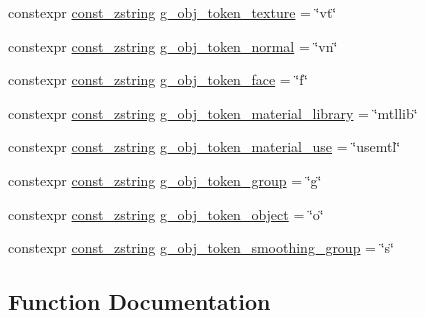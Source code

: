 \begin{DoxyCompactItemize}
\item 
constexpr \hyperlink{namespacemage_abfd9206dc607ceb5d13ec68bf075a5c0}{const\+\_\+zstring} \hyperlink{namespacemage_1_1rendering_1_1loader_a2f28917cef298bc975a0a9b5ceecfb34}{g\+\_\+obj\+\_\+token\+\_\+texture} = \char`\"{}vt\char`\"{}
\item 
constexpr \hyperlink{namespacemage_abfd9206dc607ceb5d13ec68bf075a5c0}{const\+\_\+zstring} \hyperlink{namespacemage_1_1rendering_1_1loader_a1ccd473a1d57fa2581197b20131a7e98}{g\+\_\+obj\+\_\+token\+\_\+normal} = \char`\"{}vn\char`\"{}
\item 
constexpr \hyperlink{namespacemage_abfd9206dc607ceb5d13ec68bf075a5c0}{const\+\_\+zstring} \hyperlink{namespacemage_1_1rendering_1_1loader_ac729da300a11d2af468702b4fd8c17a0}{g\+\_\+obj\+\_\+token\+\_\+face} = \char`\"{}f\char`\"{}
\item 
constexpr \hyperlink{namespacemage_abfd9206dc607ceb5d13ec68bf075a5c0}{const\+\_\+zstring} \hyperlink{namespacemage_1_1rendering_1_1loader_adeb966ab9cb13f0665a23d31d34fc85b}{g\+\_\+obj\+\_\+token\+\_\+material\+\_\+library} = \char`\"{}mtllib\char`\"{}
\item 
constexpr \hyperlink{namespacemage_abfd9206dc607ceb5d13ec68bf075a5c0}{const\+\_\+zstring} \hyperlink{namespacemage_1_1rendering_1_1loader_aca66c986fe0debd4ea787ff4464fbb72}{g\+\_\+obj\+\_\+token\+\_\+material\+\_\+use} = \char`\"{}usemtl\char`\"{}
\item 
constexpr \hyperlink{namespacemage_abfd9206dc607ceb5d13ec68bf075a5c0}{const\+\_\+zstring} \hyperlink{namespacemage_1_1rendering_1_1loader_a71c11c96ce588a1bc2dda43c4b0711c1}{g\+\_\+obj\+\_\+token\+\_\+group} = \char`\"{}g\char`\"{}
\item 
constexpr \hyperlink{namespacemage_abfd9206dc607ceb5d13ec68bf075a5c0}{const\+\_\+zstring} \hyperlink{namespacemage_1_1rendering_1_1loader_a8127f2d8ffe798289f55d789c317ef19}{g\+\_\+obj\+\_\+token\+\_\+object} = \char`\"{}o\char`\"{}
\item 
constexpr \hyperlink{namespacemage_abfd9206dc607ceb5d13ec68bf075a5c0}{const\+\_\+zstring} \hyperlink{namespacemage_1_1rendering_1_1loader_aa21b49ead7809938e24c738c71f408c0}{g\+\_\+obj\+\_\+token\+\_\+smoothing\+\_\+group} = \char`\"{}s\char`\"{}
\end{DoxyCompactItemize}


\subsection{Function Documentation}
\hypertarget{namespacemage_1_1rendering_1_1loader_a7f18d95a448d41b4879cf887e47a3b2c}{}\label{namespacemage_1_1rendering_1_1loader_a7f18d95a448d41b4879cf887e47a3b2c} 

